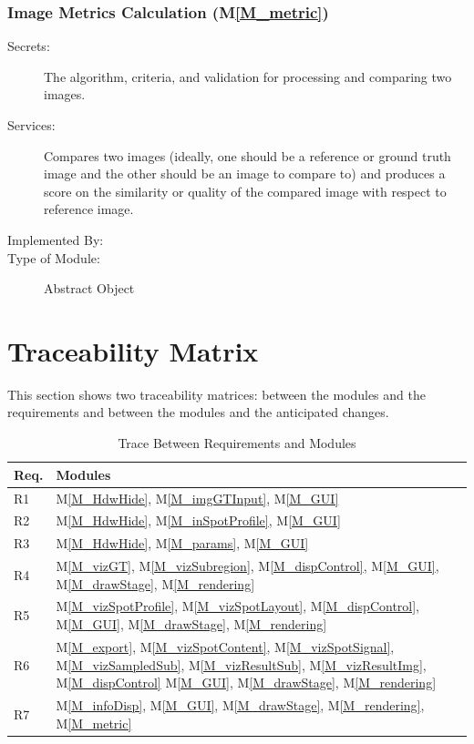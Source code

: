\documentclass[12pt, titlepage]{article}
\newcommand{\mref}[1]{M\ref{#1}}
\begin{document}
\subsubsection{Image Metrics Calculation (\mref{M_metric})}
\begin{description}
\item[Secrets:] The algorithm, criteria, and validation for processing and comparing two images.
\item[Services:] Compares two images (ideally, one should be a reference or ground truth image
  and the other should be an image to compare to) and produces a score on the 
  similarity or quality of the compared image with respect to reference image.
\item[Implemented By:] \progname{}
\item[Type of Module:] Abstract Object
\end{description}



\section{Traceability Matrix} \label{SecTM}

This section shows two traceability matrices: between the modules and the
requirements and between the modules and the anticipated changes.

\begin{table}[H]
\centering
\begin{tabular}{p{} p{}}
\toprule
\textbf{Req.} & \textbf{Modules}\\
\midrule
R1 & \mref{M_HdwHide}, \mref{M_imgGTInput}, \mref{M_GUI}\\
R2 & \mref{M_HdwHide}, \mref{M_inSpotProfile}, \mref{M_GUI}\\
R3 & \mref{M_HdwHide}, \mref{M_params}, \mref{M_GUI}\\
R4 & \mref{M_vizGT}, \mref{M_vizSubregion}, \mref{M_dispControl}, \mref{M_GUI}, \mref{M_drawStage}, \mref{M_rendering}\\
R5 & \mref{M_vizSpotProfile}, \mref{M_vizSpotLayout}, \mref{M_dispControl}, \mref{M_GUI}, \mref{M_drawStage}, \mref{M_rendering}\\
R6 & \mref{M_export}, \mref{M_vizSpotContent}, \mref{M_vizSpotSignal}, \mref{M_vizSampledSub}, \mref{M_vizResultSub}, \mref{M_vizResultImg}, \mref{M_dispControl} \mref{M_GUI}, \mref{M_drawStage}, \mref{M_rendering}\\
R7 & \mref{M_infoDisp}, \mref{M_GUI}, \mref{M_drawStage}, \mref{M_rendering}, \mref{M_metric}\\
\bottomrule
\end{tabular}
\caption{Trace Between Requirements and Modules}
\label{TblRT}
\end{table}
\end{document}
